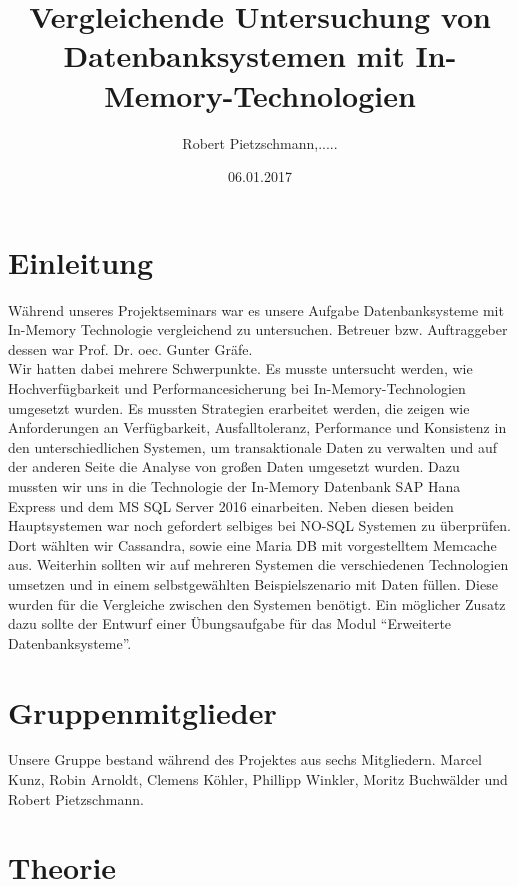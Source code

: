 \documentclass[a4paper, 12pt]{scrartcl}
\title{Vergleichende Untersuchung von Datenbanksystemen mit In-Memory-Technologien}
\author{Robert Pietzschmann,.....}
\date{06.01.2017}
\begin{document}
\maketitle
\newpage
\tableofcontents
\newpage

\section{Einleitung}
Während unseres Projektseminars war es unsere Aufgabe Datenbanksysteme mit In-Memory Technologie vergleichend zu untersuchen. Betreuer bzw. Auftraggeber dessen war Prof. Dr. oec. Gunter Gräfe.\\ Wir hatten dabei mehrere Schwerpunkte. Es musste untersucht werden, wie Hochverfügbarkeit und Performancesicherung bei In-Memory-Technologien umgesetzt wurden. Es mussten Strategien erarbeitet werden, die zeigen wie Anforderungen an Verfügbarkeit, Ausfalltoleranz, Performance und Konsistenz in den unterschiedlichen Systemen, um transaktionale Daten zu verwalten und auf der anderen Seite die Analyse von großen Daten umgesetzt wurden. Dazu mussten wir uns in die Technologie der In-Memory Datenbank SAP Hana Express und dem MS SQL Server 2016 einarbeiten. Neben diesen beiden Hauptsystemen war noch gefordert selbiges bei NO-SQL Systemen zu überprüfen. Dort wählten wir Cassandra, sowie eine Maria DB mit vorgestelltem Memcache aus. Weiterhin sollten wir auf mehreren Systemen die verschiedenen Technologien umsetzen und in einem selbstgewählten Beispielszenario mit Daten füllen. Diese wurden für die Vergleiche zwischen den Systemen benötigt. Ein möglicher Zusatz dazu sollte der Entwurf einer Übungsaufgabe für das Modul "`Erweiterte Datenbanksysteme"'.  


\section{Gruppenmitglieder}
Unsere Gruppe bestand während des Projektes aus sechs Mitgliedern. Marcel Kunz, Robin Arnoldt, Clemens Köhler, Phillipp Winkler, Moritz Buchwälder und Robert Pietzschmann. 
\newpage
\section{Theorie}
\end{document}
